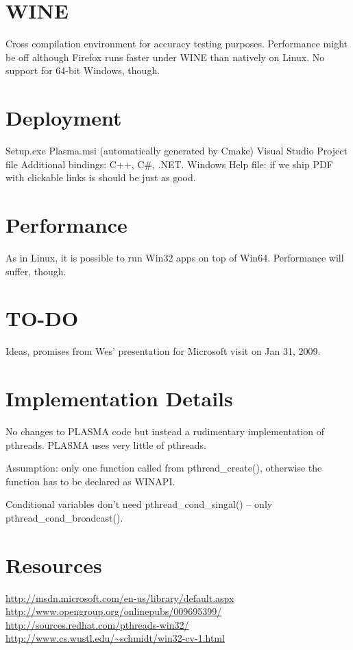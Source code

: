 \documentclass[letterpaper]{article}
\newcommand\ilc[1]{\textsf{#1}}
\begin{document}
\section{WINE}
Cross compilation environment for accuracy testing purposes. Performance might
be off although Firefox runs faster under WINE than natively on Linux.
No support for 64-bit Windows, though.

\section{Deployment}
Setup.exe
Plasma.msi (automatically generated by Cmake)
Visual Studio Project file
Additional bindings: C++, C\#, .NET.
Windows Help file: if we ship PDF with clickable links is should be just as good.

\section{Performance}
As in Linux, it is possible to run Win32 apps on top of Win64.
Performance will suffer, though.

\section{TO-DO}
Ideas, promises from Wes' presentation for Microsoft visit on Jan 31, 2009.

\section{Implementation Details}
No changes to PLASMA code but instead a rudimentary implementation of pthreads.
PLASMA uses very little of pthreads.

Assumption: only one function called from \ilc{pthread\_create()}, otherwise
the function has to be declared as WINAPI.

Conditional variables don't need pthread\_cond\_singal() -- only pthread\_cond\_broadcast().

\section{Resources}
\url{http://msdn.microsoft.com/en-us/library/default.aspx}
\url{http://www.opengroup.org/onlinepubs/009695399/}
\url{http://sources.redhat.com/pthreads-win32/}
\url{http://www.cs.wustl.edu/~schmidt/win32-cv-1.html}
\end{document}
